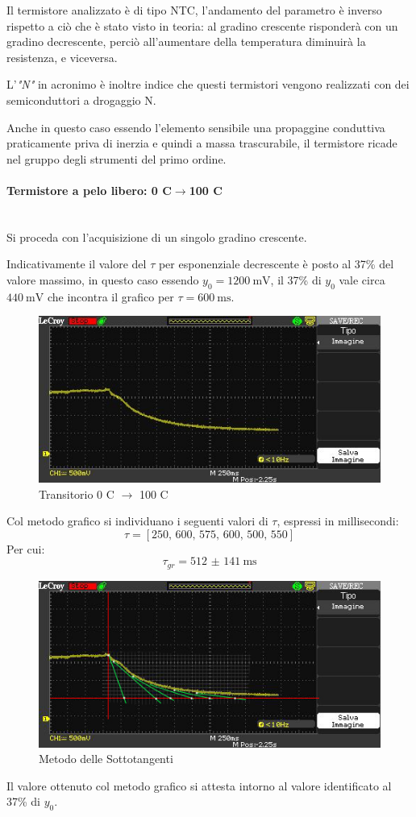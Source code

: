 \documentclass[a4paper, 12pt, twoside]{report}
\begin{document}
		Il termistore analizzato è di tipo NTC, l’andamento del parametro è inverso rispetto a ciò che è stato visto in teoria: al gradino crescente risponderà con un gradino decrescente, perciò all'aumentare della temperatura diminuirà la resistenza, e viceversa. 
		
		L’\textit{"N"} in acronimo è inoltre indice che questi termistori vengono realizzati con dei semiconduttori a drogaggio N. \newline
		
		Anche in questo caso essendo l'elemento sensibile una propaggine conduttiva praticamente priva di inerzia e quindi a massa trascurabile, il termistore ricade nel gruppo degli strumenti del primo ordine. 
		
\newpage
		
		\paragraph{Termistore a pelo libero: 0 \degree C$\rightarrow$100 \degree C} \mbox{}\\
		Si proceda con l'acquisizione di un singolo gradino crescente. \newline 
		
		Indicativamente il valore del $\tau$ per esponenziale decrescente è posto al 37\% del valore massimo, in questo caso essendo $y_0 = \SI{1200}{\milli\volt}$, il 37\% di $y_0$ vale circa $\SI{440}{\milli\volt}$ che incontra il grafico per $\tau=\SI{600}{\milli\second}$.		
		\begin{figure}[H]
			\centering
			\includegraphics[width=0.7\linewidth]{immaginioscillo/4}
			\caption{Transitorio 0 \degree C $\rightarrow$ 100 \degree C}
			\label{fig:7}
		\end{figure}				
		Col metodo grafico si individuano i seguenti valori di $\tau$, espressi in millisecondi:
		\[ \tau = [250,\, 600,\, 575,\, 600,\, 500,\, 550]\]
		Per cui:
		\[\tau_{gr} = \SI[separate-uncertainty = true]{512(141)}{\milli\second}\]		
		\begin{figure}[H]
			\centering
			\includegraphics[width=0.7\linewidth]{immaginioscillo/4+}
			\caption{Metodo delle Sottotangenti}
			\label{fig:8}
		\end{figure}		
		Il valore ottenuto col metodo grafico si attesta intorno al valore identificato al 37\% di $y_0$.	
\end{document}
